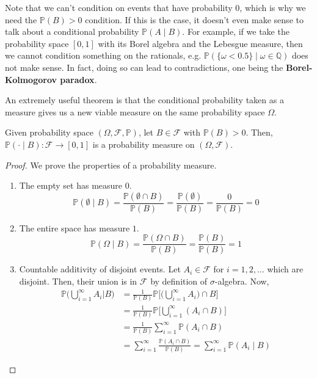 \documentclass{article}
\begin{document}
      Note that we can't condition on events that have probability $0$, which is why we need the $\mathbb{P}(B) > 0$ condition. If this is the case, it doesn't even make sense to talk about a conditional probability $\mathbb{P}(A \mid B)$. For example, if we take the probability space $[0, 1]$ with its Borel algebra and the Lebesgue measure, then we cannot condition something on the rationals, e.g. $\mathbb{P}(\{\omega < 0.5\} \mid \omega \in \mathbb{Q})$ does not make sense. In fact, doing so can lead to contradictions, one being the \textbf{Borel-Kolmogorov paradox}. 

      An extremely useful theorem is that the conditional probability taken as a measure gives us a new viable measure on the same probability space $\Omega$. 

      \begin{theorem}
        Given probability space $(\Omega, \mathcal{F}, \mathbb{P})$, let $B \in \mathcal{F}$ with $\mathbb{P}(B) > 0$. Then, $\mathbb{P}( \cdot \mid B): \mathcal{F} \longrightarrow [0, 1]$ is a probability measure on $(\Omega, \mathcal{F})$. 
      \end{theorem}
      \begin{proof}
        We prove the properties of a probability measure. 
        \begin{enumerate}
          \item The empty set has measure $0$. 
          \begin{equation}
            \mathbb{P}(\emptyset \mid B) = \frac{\mathbb{P}( \emptyset \cap B)}{\mathbb{P}(B)} = \frac{\mathbb{P}(\emptyset)}{\mathbb{P}(B)} = \frac{0}{\mathbb{P}(B)} = 0
          \end{equation}
          \item The entire space has measure $1$. 
          \begin{equation}
            \mathbb{P}(\Omega \mid B) =  \frac{\mathbb{P}( \Omega \cap B)}{\mathbb{P}(B)} = \frac{\mathbb{P}(B)}{\mathbb{P}(B)} = 1
          \end{equation}
          \item Countable additivity of disjoint events. Let $A_i \in \mathcal{F}$ for $i = 1, 2, \ldots$ which are disjoint. Then, their union is in $\mathcal{F}$ by definition of $\sigma$-algebra. Now, 
          \begin{align*}
            \mathbb{P}\bigg( \bigcup_{i=1}^\infty A_i \bigg| B \bigg) & = \frac{1}{\mathbb{P}(B)} \mathbb{P} \bigg[ \Big( \bigcup_{i=1}^\infty A_i \Big) \cap B \bigg] \\
            & = \frac{1}{\mathbb{P}(B)} \mathbb{P} \bigg[ \bigcup_{i=1}^\infty (A_i \cap B) \bigg] \\
            & = \frac{1}{\mathbb{P}(B)} \sum_{i=1}^\infty \mathbb{P} (A_i \cap B) \\
            & = \sum_{i=1}^\infty \frac{\mathbb{P} (A_i \cap B)}{\mathbb{P}(B)} = \sum_{i=1}^\infty \mathbb{P}(A_i \mid B) 
          \end{align*}
        \end{enumerate}
      \end{proof}
\end{document}

